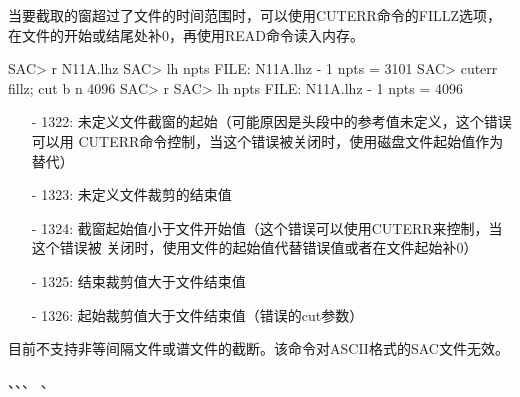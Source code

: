 当要截取的窗超过了文件的时间范围时，可以使用CUTERR命令的FILLZ选项，
在文件的开始或结尾处补0，再使用READ命令读入内存。
\begin{SACCode}
SAC> r N11A.lhz
SAC> lh npts
FILE: N11A.lhz - 1
npts = 3101
SAC> cuterr fillz; cut b n 4096
SAC> r
SAC> lh npts
FILE: N11A.lhz - 1
npts = 4096
\end{SACCode}

\begin{itemize}
\item[-]1322: 未定义文件截窗的起始（可能原因是头段中的参考值未定义，这个错误可以用
    CUTERR命令控制，当这个错误被关闭时，使用磁盘文件起始值作为替代）
\item[-]1323: 未定义文件裁剪的结束值
\item[-]1324: 截窗起始值小于文件开始值（这个错误可以使用CUTERR来控制，当这个错误被
    关闭时，使用文件的起始值代替错误值或者在文件起始补0）
\item[-]1325: 结束裁剪值大于文件结束值
\item[-]1326: 起始裁剪值大于文件结束值（错误的cut参数）
\end{itemize}

目前不支持非等间隔文件或谱文件的截断。该命令对ASCII格式的SAC文件无效。

、、、
、
